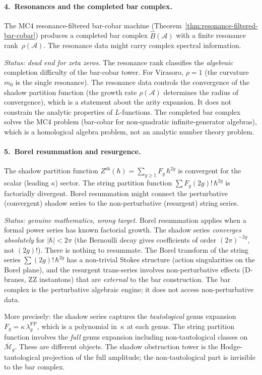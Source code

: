 \documentclass[11pt]{article}
\newcommand{\cA}{\mathcal{A}}
\newcommand{\cM}{\mathcal{M}}
\begin{document}
\paragraph{4.~Resonances and the completed bar complex.}
The MC4 resonance-filtered bar-cobar machine
(Theorem~\ref{thm:resonance-filtered-bar-cobar}) produces a
completed bar complex $\hat{B}(\cA)$ with a finite resonance
rank~$\rho(\cA)$.  The resonance data might carry complex
spectral information.

\emph{Status: dead end for zeta zeros.}  The resonance rank
classifies the \emph{algebraic} completion difficulty of the
bar-cobar tower.  For Virasoro, $\rho = 1$ (the curvature
$m_0$ is the single resonance).  The resonance data controls
the convergence of the shadow partition function (the growth
rate $\rho(\cA)$ determines the radius of convergence), which
is a statement about the arity expansion.  It does not
constrain the analytic properties of $L$-functions.  The
completed bar complex solves the MC4 problem (bar-cobar for
non-quadratic infinite-generator algebras), which is a
homological algebra problem, not an analytic number theory
problem.

\paragraph{5.~Borel resummation and resurgence.}
The shadow partition function $Z^{\mathrm{sh}}(\hbar)
= \sum_{g \ge 1} F_g\, \hbar^{2g}$ is convergent for
the scalar (leading $\kappa$) sector.  The string partition
function $\sum F_g (2g)!\, \hbar^{2g}$ is factorially
divergent.  Borel resummation might connect the perturbative
(convergent) shadow series to the non-perturbative (resurgent)
string series.

\emph{Status: genuine mathematics, wrong target.}
Borel resummation applies when a formal power series has
known factorial growth.  The shadow series \emph{converges
absolutely} for $|\hbar| < 2\pi$ (the Bernoulli decay gives
coefficients of order $(2\pi)^{-2g}$, not $(2g)!$).  There is
nothing to resummate.  The Borel transform of the string series
$\sum (2g)!\, \hbar^{2g}$ has a non-trivial Stokes structure
(action singularities on the Borel plane), and the resurgent
trans-series involves non-perturbative effects (D-branes, ZZ
instantons) that are \emph{external} to the bar construction.
The bar complex is the perturbative algebraic engine; it does
not access non-perturbative data.

More precisely: the shadow series captures the
\emph{tautological} genus expansion $F_g = \kappa\,
\lambda_g^{\mathrm{FP}}$, which is a polynomial in~$\kappa$
at each genus.  The string partition function involves
the \emph{full} genus expansion including non-tautological
classes on $\overline{\cM}_g$.  These are different objects.
The shadow obstruction tower is the Hodge-tautological projection of the
full amplitude; the non-tautological part is invisible to the
bar complex.
\end{document}
